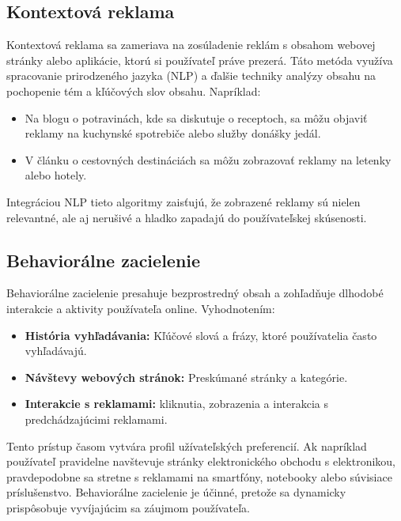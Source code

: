 \documentclass[10pt,slovak,a4paper]{article}
\begin{document}
\subsection{Kontextová reklama}
Kontextová reklama sa zameriava na zosúladenie reklám s obsahom webovej stránky alebo aplikácie, ktorú si používateľ práve prezerá. Táto metóda využíva spracovanie prirodzeného jazyka (NLP) a ďalšie techniky analýzy obsahu na pochopenie tém a kľúčových slov obsahu. Napríklad:
\begin{itemize}
    \item Na blogu o potravinách, kde sa diskutuje o receptoch, sa môžu objaviť reklamy na kuchynské spotrebiče alebo služby donášky jedál.
    \item V článku o cestovných destináciách sa môžu zobrazovať reklamy na letenky alebo hotely.
\end{itemize}
Integráciou NLP tieto algoritmy zaisťujú, že zobrazené reklamy sú nielen relevantné, ale aj nerušivé a hladko zapadajú do používateľskej skúsenosti.

\subsection{Behaviorálne zacielenie}
Behaviorálne zacielenie presahuje bezprostredný obsah a zohľadňuje dlhodobé interakcie a aktivity používateľa online. Vyhodnotením:
\begin{itemize}
    \item \textbf{História vyhľadávania:} Kľúčové slová a frázy, ktoré používatelia často vyhľadávajú.
    \item \textbf{Návštevy webových stránok:} Preskúmané stránky a kategórie.
    \item \textbf{Interakcie s reklamami:} kliknutia, zobrazenia a interakcia s predchádzajúcimi reklamami.
\end{itemize}
Tento prístup časom vytvára profil užívateľských preferencií. Ak napríklad používateľ pravidelne navštevuje stránky elektronického obchodu s elektronikou, pravdepodobne sa stretne s reklamami na smartfóny, notebooky alebo súvisiace príslušenstvo. Behaviorálne zacielenie je účinné, pretože sa dynamicky prispôsobuje vyvíjajúcim sa záujmom používateľa.
 
\end{document}

